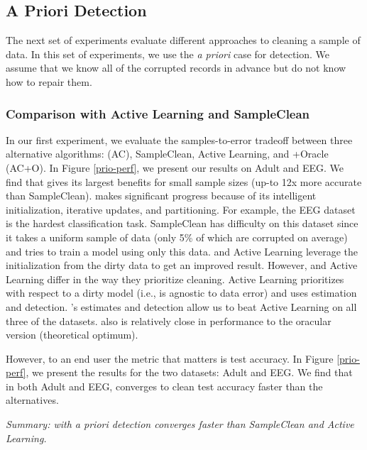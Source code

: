 \subsection{\sys A Priori Detection}
The next set of experiments evaluate different approaches to cleaning a sample of data.
In this set of experiments, we use the \emph{a priori} case for detection.
We assume that we know all of the corrupted records in advance but do not know how to repair them. 

\subsubsection{Comparison with Active Learning and SampleClean}
In our first experiment, we evaluate the samples-to-error tradeoff between three alternative algorithms: \sys (AC), SampleClean, Active Learning, and \sys+Oracle (AC+O).
In Figure \ref{prio-perf}, we present our results on Adult and EEG. 
We find that \sys gives its largest benefits for small sample sizes (up-to 12x more accurate than SampleClean).
\sys makes significant progress because of its intelligent initialization, iterative updates, and partitioning.
For example, the EEG dataset is the hardest classification task.
SampleClean has difficulty on this dataset since it takes a uniform sample of data (only 5\% of which are corrupted on average) and tries to train a model using only this data.
\sys and Active Learning leverage the initialization from the dirty data to get an improved result. 
However, \sys and Active Learning differ in the way they prioritize cleaning.
Active Learning prioritizes with respect to a dirty model (i.e., is agnostic to data error) and \sys uses estimation and detection.
\sys's estimates and detection allow us to beat Active Learning on all three of the datasets.
\sys also is relatively close in performance to the oracular version (theoretical optimum).

However, to an end user the metric that matters is test accuracy.
In Figure \ref{prio-perf}, we present the results for the two datasets: Adult and EEG.
We find that in both Adult and EEG, \sys converges to clean test accuracy faster than the alternatives.

\vspace{0.25em}

\noindent \emph{Summary: \sys with a priori detection converges faster than SampleClean and Active Learning.}


